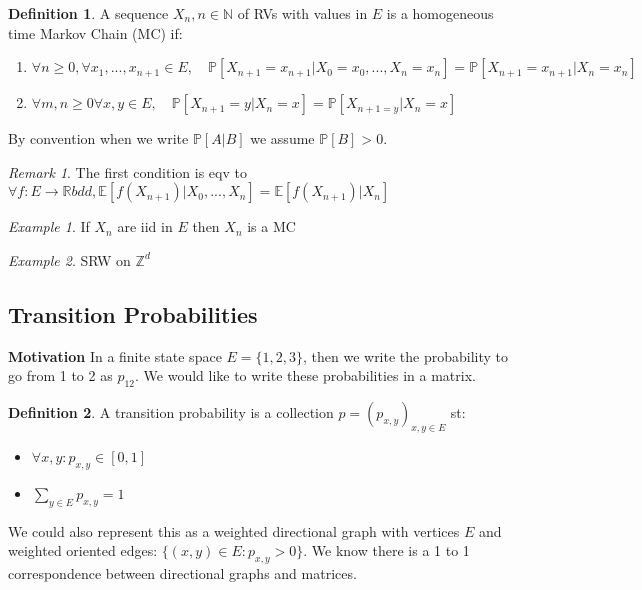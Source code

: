 \documentclass[12pt]{book}
\theoremstyle{definition}
\newtheorem{defn}{Definition}[section]
\theoremstyle{remark}
\newtheorem{ex}{Example}[section]
\newtheorem{rmk}[theorem]{Remark}
\begin{document}
\begin{defn}
	A sequence $X_n, n \in \mathbb{N}$ of RVs with values in $E$ is a homogeneous time Markov Chain (MC) if:
\begin{enumerate}
    \item  $\forall n \geq 0, \forall x_1,...,x_{n+1}\in E, \quad \mathbb{P} \left[ X_{n+1}=x_{n+1} | X_0=x_0,...,X_n=x_n \right] = \mathbb{P} \left[ X_{n+1}=x_{n+1} | X_n = x_n \right] $
	\item $\forall m,n \geq 0 \forall x,y \in E, \quad \mathbb{P} \left[ X_{n+1}=y | X_{n}=x \right] = \mathbb{P} \left[ X_{n+1=y}| X_n=x \right] $
\end{enumerate}

\end{defn}


By convention when we write $\mathbb{P} \left[ A|B \right] $ we assume $\mathbb{P} \left[ B \right] >0$.

\begin{rmk}
The first condition is eqv to $\forall f:E\to \mathbb{R} bdd, \mathbb{E} \left[ f(X_{n+1}) | X_0,...,X_n \right] = \mathbb{E} \left[ f(X_{n+1}) | X_n \right] $
\end{rmk}

\begin{ex}
	If $X_n$ are iid in $E$ then $X_n$ is a MC
\end{ex}

\begin{ex}
	SRW on $\mathbb{Z}^d$
\end{ex}

\subsection{Transition Probabilities}
\textbf{Motivation} In a finite state space $E=\{1,2,3\}$, then we write the probability to go from 1 to 2 as $p_{12}$. We would like to write these probabilities in a matrix.

\begin{defn}
	A transition probability is a collection $p=(p_{x,y})_{x,y \in E}$ st:
	\begin{itemize}
		\item $\forall x,y: p_{x,y}\in [0,1]$ 
		\item $\sum_{y \in E} p_{x,y}=1$
	\end{itemize}
	
\end{defn}

We could also represent this as a weighted directional graph with vertices $E$ and weighted oriented edges: $\{(x,y) \in E: p_{x,y}>0\}$. We know there is a 1 to 1 correspondence between directional graphs and matrices.
\end{document}
